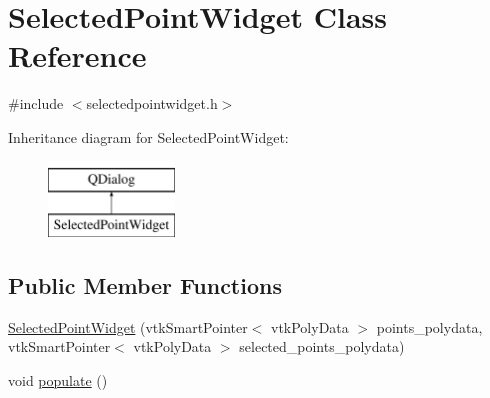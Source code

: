\hypertarget{class_selected_point_widget}{}\section{Selected\+Point\+Widget Class Reference}
\label{class_selected_point_widget}


{\ttfamily \#include $<$selectedpointwidget.\+h$>$}

Inheritance diagram for Selected\+Point\+Widget\+:\begin{figure}[H]
\begin{center}
\leavevmode
\includegraphics[height=2.000000cm]{class_selected_point_widget}
\end{center}
\end{figure}
\subsection*{Public Member Functions}
\begin{DoxyCompactItemize}
\item 
\hyperlink{class_selected_point_widget_a6973c27e249b2956b820cc67d8e01353}{Selected\+Point\+Widget} (vtk\+Smart\+Pointer$<$ vtk\+Poly\+Data $>$ points\+\_\+polydata, vtk\+Smart\+Pointer$<$ vtk\+Poly\+Data $>$ selected\+\_\+points\+\_\+polydata)
\item 
void \hyperlink{class_selected_point_widget_afd1322240157289461a8e97b744519c5}{populate} ()
\end{DoxyCompactItemize}
